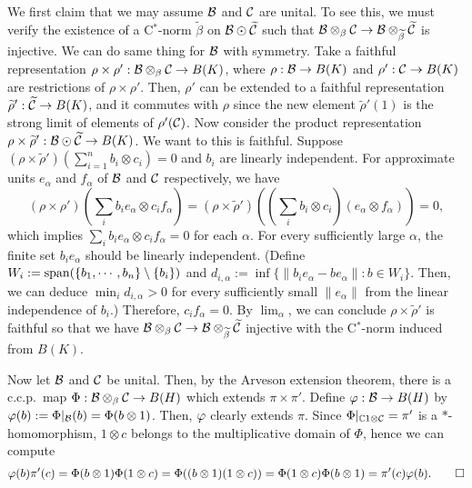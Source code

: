 \documentclass{../../small}
\begin{document}
\begin{pf}
We first claim that we may assume $\mathcal{B}$ and $\mathcal{C}$ are unital.
To see this, we must verify the existence of a C$^*$-norm $\tilde\beta$ on $\mathcal{B}\odot\widetilde{\mathcal{C}}$ such that $\mathcal{B}\otimes_\beta\mathcal{C}\to\mathcal{B}\otimes_{\widetilde\beta}\widetilde{\mathcal{C}}$ is injective.
We can do same thing for $\mathcal{B}$ with symmetry.
Take a faithful representation $\rho\times\rho':\mathcal{B}\otimes_\beta\mathcal{C}\to B(K)$, where $\rho:\mathcal{B}\to B(K)$ and $\rho':\mathcal{C}\to B(K)$ are restrictions of $\rho\times\rho'$.
Then, $\rho'$ can be extended to a faithful representation $\widetilde\rho':\widetilde{\mathcal{C}}\to B(K)$, and it commutes with $\rho$ since the new element $\tilde\rho'(1)$ is the strong limit of elements of $\rho'(\mathcal{C})$.
Now consider the product representation $\rho\times\widetilde\rho':\mathcal{B}\odot\widetilde{\mathcal{C}}\to B(K)$.
We want to this is faithful.
Suppose $(\rho\times\tilde\rho')(\sum_{i=1}^nb_i\otimes c_i)=0$ and $b_i$ are linearly independent.
For approximate units $e_\alpha$ and $f_\alpha$ of $\mathcal{B}$ and $\mathcal{C}$ respectively, we have
\[(\rho\times\rho')(\sum_ib_ie_\alpha\otimes c_if_\alpha)=(\rho\times\tilde\rho')((\sum_ib_i\otimes c_i)(e_\alpha\otimes f_\alpha))=0,\]
which implies $\sum_ib_ie_\alpha\otimes c_if_\alpha=0$ for each $\alpha$.
For every sufficiently large $\alpha$, the finite set $b_ie_\alpha$ should be linearly independent.
(Define $W_i:=\operatorname{span}(\{b_1,\cdots,b_n\}\setminus\{b_i\})$ and $d_{i,\alpha}:=\inf\{\|b_ie_\alpha-be_\alpha\|:b\in W_i\}$. Then, we can deduce $\min_id_{i,\alpha}>0$ for every sufficiently small $\|e_\alpha\|$ from the linear independence of $b_i$.)
Therefore, $c_if_\alpha=0$.
By $\lim_\alpha$, we can conclude $\rho\times\tilde\rho'$ is faithful so that we have $\mathcal{B}\otimes_\beta\mathcal{C}\to\mathcal{B}\otimes_{\widetilde\beta}\widetilde{\mathcal{C}}$ injective with the C$^*$-norm induced from $B(K)$.

Now let $\mathcal{B}$ and $\mathcal{C}$ be unital.
Then, by the Arveson extension theorem, there is a c.c.p.~map $\Phi:\mathcal{B}\otimes_\beta\mathcal{C}\to B(H)$ which extends $\pi\times\pi'$.
Define $\varphi:\mathcal{B}\to B(H)$ by $\varphi(b):=\Phi|_{\mathcal{B}}(b)=\Phi(b\otimes1)$.
Then, $\varphi$ clearly extends $\pi$.
Since $\Phi|_{\mathbb{C}1\otimes\mathcal{C}}=\pi'$ is a $*$-homomorphism, $1\otimes c$ belongs to the multiplicative domain of $\Phi$, hence we can compute
\[\varphi(b)\pi'(c)=\Phi(b\otimes1)\Phi(1\otimes c)=\Phi((b\otimes1)(1\otimes c))=\Phi(1\otimes c)\Phi(b\otimes1)=\pi'(c)\varphi(b).\qedhere\]
\end{pf}
\end{document}
